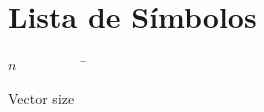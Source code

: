 \newpage
\chapter*{Lista de Símbolos\hfill}
\begin{tabbing}
$n$~~~~~~~~~~\=\parbox{5in}{Vector size\dotfill \pageref{symbol:nml}}\\



\end{tabbing}
